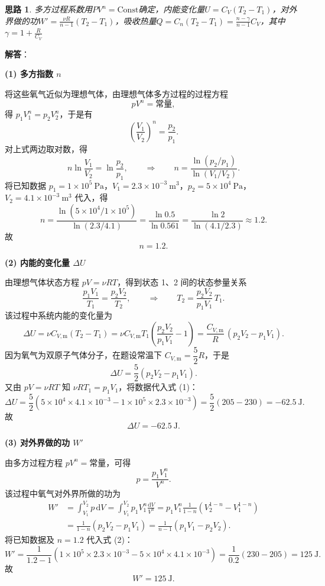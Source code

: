 \documentclass[UTF8]{ctexart}
\newtheorem{thoughts}{思路}[subsection]
\begin{document}
\begin{thoughts}
  多方过程系数用$PV^n=\text{Const}$确定，内能变化量$U=C_V(T_2-T_1)$，对外界做的功$W'=\frac{\nu R}{n-1}(T_2-T_1)$，吸收热量$Q=C_n(T_2-T_1)=\frac{n-\gamma}{n-1}C_V$，其中$\gamma = 1 + \frac{R}{C_V}$
\end{thoughts}

\textbf{解答}：

\textbf{(1) 多方指数 $n$}

将这些氧气近似为理想气体，由理想气体多方过程的过程方程
\[
pV^{n}=\text{常量},
\]
得 $p_1V_1^{n}=p_2V_2^{n}$，于是有
\[
\left(\frac{V_1}{V_2}\right)^{n}=\frac{p_2}{p_1}.
\]
对上式两边取对数，得
\[
n\ln\frac{V_1}{V_2}=\ln\frac{p_2}{p_1},
\qquad\Longrightarrow\qquad
n=\frac{\ln(p_2/p_1)}{\ln(V_1/V_2)}.
\]
将已知数据 $p_1=1\times 10^5\ \mathrm{Pa}$，$V_1=2.3\times 10^{-3}\ \mathrm{m^3}$，$p_2=5\times 10^4\ \mathrm{Pa}$，$V_2=4.1\times 10^{-3}\ \mathrm{m^3}$ 代入，得
\[
n=\frac{\ln(5\times 10^4/1\times 10^5)}{\ln(2.3/4.1)}
=\frac{\ln 0.5}{\ln 0.561}
=\frac{\ln 2}{\ln(4.1/2.3)}
\approx 1.2.
\]
故
\[
\boxed{n=1.2}.
\]

\textbf{(2) 内能的变化量 $\Delta U$}

由理想气体状态方程 $pV=\nu RT$，得到状态 1、2 间的状态参量关系
\[
\frac{p_1V_1}{T_1}=\frac{p_2V_2}{T_2},
\qquad\Longrightarrow\qquad
T_2=\frac{p_2V_2}{p_1V_1}\,T_1.
\]
该过程中系统内能的变化量为
\[
\Delta U=\nu C_{V,\mathrm{m}}(T_2-T_1)
=\nu C_{V,\mathrm{m}}T_1\left(\frac{p_2V_2}{p_1V_1}-1\right)
=\frac{C_{V,\mathrm{m}}}{R}\,(p_2V_2-p_1V_1).
\]
因为氧气为双原子气体分子，在题设常温下 $C_{V,\mathrm{m}}=\dfrac{5}{2}R$，于是
\[
\Delta U=\frac{5}{2}(p_2V_2-p_1V_1).
\tag{1}
\]
又由 $pV=\nu RT$ 知 $\nu RT_1=p_1V_1$，将数据代入式 (1)：
\[
\Delta U=\frac{5}{2}\left(5\times 10^4\times 4.1\times 10^{-3}
-1\times 10^5\times 2.3\times 10^{-3}\right)
=\frac{5}{2}(205-230)
=-62.5\ \mathrm{J}.
\]
故
\[
\boxed{\Delta U=-62.5\ \mathrm{J}}.
\]

\textbf{(3) 对外界做的功 $W'$}

由多方过程方程 $pV^{n}=\text{常量}$，可得
\[
p=\frac{p_1V_1^{n}}{V^{n}}.
\]
该过程中氧气对外界所做的功为
\begin{align*}
W'&=\int_{V_1}^{V_2}p\,\mathrm{d}V
=\int_{V_1}^{V_2}p_1V_1^{n}\frac{\mathrm{d}V}{V^{n}}
=p_1V_1^{n}\frac{1}{1-n}\left(V_2^{1-n}-V_1^{1-n}\right) \\[4pt]
&=\frac{1}{1-n}\left(p_2V_2-p_1V_1\right)
=\frac{1}{n-1}\left(p_1V_1-p_2V_2\right).
\tag{2}
\end{align*}
将已知数据及 $n=1.2$ 代入式 (2)：
\[
W'=\frac{1}{1.2-1}\left(1\times 10^5\times 2.3\times 10^{-3}
-5\times 10^4\times 4.1\times 10^{-3}\right)
=\frac{1}{0.2}(230-205)
=125\ \mathrm{J}.
\]
故
\[
\boxed{W'=125\ \mathrm{J}}.
\]
\end{document}
